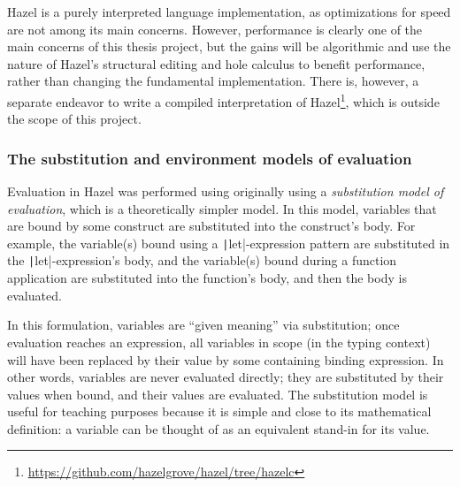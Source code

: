 Hazel is a purely interpreted language implementation, as optimizations for speed are not among its main concerns. However, performance is clearly one of the main concerns of this thesis project, but the gains will be algorithmic and use the nature of Hazel's structural editing and hole calculus to benefit performance, rather than changing the fundamental implementation. There is, however, a separate endeavor to write a compiled interpretation of Hazel\footnote{\url{https://github.com/hazelgrove/hazel/tree/hazelc}}, which is outside the scope of this project.

\subsubsection{The substitution and environment models of evaluation}
\label{sec:sub_vs_eval}



Evaluation in Hazel was performed using originally using a \textit{substitution model of evaluation}, which is a theoretically simpler model. In this model, variables that are bound by some construct are substituted into the construct's body. For example, the variable(s) bound using a \texttt|let|-expression pattern are substituted in the \texttt|let|-expression's body, and the variable(s) bound during a function application are substituted into the function's body, and then the body is evaluated.


In this formulation, variables are ``given meaning'' via substitution; once evaluation reaches an expression, all variables in scope (in the typing context) will have been replaced by their value by some containing binding expression. In other words, variables are never evaluated directly; they are substituted by their values when bound, and their values are evaluated. The substitution model is useful for teaching purposes because it is simple and close to its mathematical definition: a variable can be thought of as an equivalent stand-in for its value.

